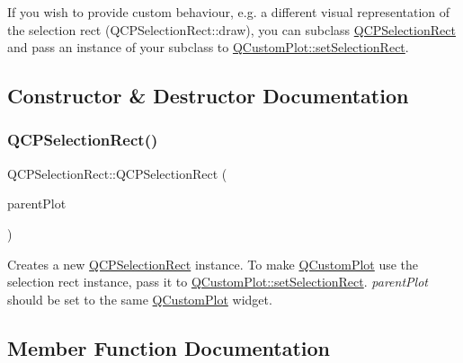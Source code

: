 If you wish to provide custom behaviour, e.\+g. a different visual representation of the selection rect (Q\+C\+P\+Selection\+Rect\+::draw), you can subclass \hyperlink{classQCPSelectionRect}{Q\+C\+P\+Selection\+Rect} and pass an instance of your subclass to \hyperlink{classQCustomPlot_a0c09f96df15faa4799ad7051bb16cf33}{Q\+Custom\+Plot\+::set\+Selection\+Rect}. 

\subsection{Constructor \& Destructor Documentation}
\mbox{\label{classQCPSelectionRect_ade6ee59fabcc585a1e281eb527b01867}} 
\subsubsection{\texorpdfstring{Q\+C\+P\+Selection\+Rect()}{QCPSelectionRect()}}
{\footnotesize\ttfamily Q\+C\+P\+Selection\+Rect\+::\+Q\+C\+P\+Selection\+Rect (\begin{DoxyParamCaption}\item[{\hyperlink{classQCustomPlot}{Q\+Custom\+Plot} $\ast$}]{parent\+Plot }\end{DoxyParamCaption})\hspace{0.3cm}{\ttfamily [explicit]}}

Creates a new \hyperlink{classQCPSelectionRect}{Q\+C\+P\+Selection\+Rect} instance. To make \hyperlink{classQCustomPlot}{Q\+Custom\+Plot} use the selection rect instance, pass it to \hyperlink{classQCustomPlot_a0c09f96df15faa4799ad7051bb16cf33}{Q\+Custom\+Plot\+::set\+Selection\+Rect}. {\itshape parent\+Plot} should be set to the same \hyperlink{classQCustomPlot}{Q\+Custom\+Plot} widget. 

\subsection{Member Function Documentation}
\mbox{\label{classQCPSelectionRect_a15a43542e1f7b953a44c260b419e6d2c}} 

